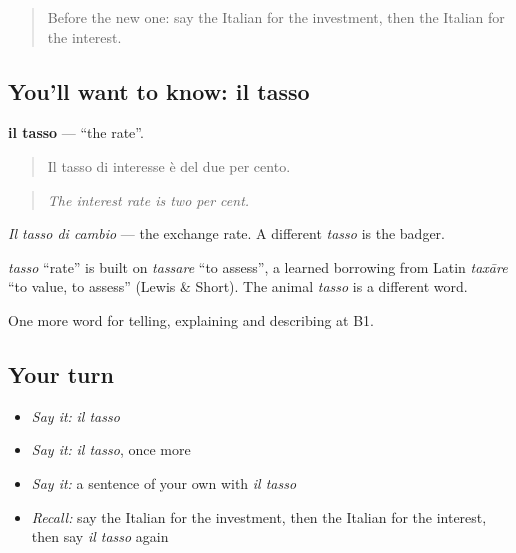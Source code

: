 \label{lesson:IT-C395-tasso}



\begin{quote}
Before the new one: say the Italian for the investment, then the Italian for the interest.
\end{quote}

\subsection*{You'll want to know: il tasso}
\textbf{il tasso} — \textquotedblleft{}the rate\textquotedblright{}.

\begin{quote}
Il tasso di interesse è del due per cento.
\end{quote}

\begin{quote}
\emph{The interest rate is two per cent.}
\end{quote}

\emph{Il tasso di cambio} — the exchange rate. A different \emph{tasso} is the badger.

\begin{cousinweb}
\emph{tasso} \textquotedblleft{}rate\textquotedblright{} is built on \emph{tassare} \textquotedblleft{}to assess\textquotedblright{}, a learned borrowing from Latin \emph{taxāre} \textquotedblleft{}to value, to assess\textquotedblright{} (Lewis \& Short). The animal \emph{tasso} is a different word.
\end{cousinweb}

\begin{grammarlens}[title={What you've built}]
One more word for telling, explaining and describing at B1.
\end{grammarlens}

\subsection*{Your turn}
\begin{itemize}
\raggedright
  \item \emph{Say it:} \emph{il tasso}
  \item \emph{Say it:} \emph{il tasso}, once more
  \item \emph{Say it:} a sentence of your own with \emph{il tasso}
  \item \emph{Recall:} say the Italian for the investment, then the Italian for the interest, then say \emph{il tasso} again
\end{itemize}

